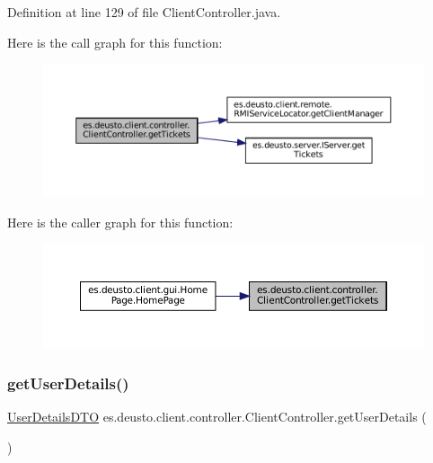 Definition at line 129 of file Client\+Controller.\+java.

Here is the call graph for this function\+:
\nopagebreak
\begin{figure}[H]
\begin{center}
\leavevmode
\includegraphics[width=350pt]{classes_1_1deusto_1_1client_1_1controller_1_1_client_controller_a672fc1afb95f03c33cd659345fe1ca71_cgraph}
\end{center}
\end{figure}
Here is the caller graph for this function\+:
\nopagebreak
\begin{figure}[H]
\begin{center}
\leavevmode
\includegraphics[width=350pt]{classes_1_1deusto_1_1client_1_1controller_1_1_client_controller_a672fc1afb95f03c33cd659345fe1ca71_icgraph}
\end{center}
\end{figure}
\mbox{\label{classes_1_1deusto_1_1client_1_1controller_1_1_client_controller_ac1bd9affe27668ee49320daae38d67a0}} 
\subsubsection{\texorpdfstring{getUserDetails()}{getUserDetails()}}
{\footnotesize\ttfamily \mbox{\hyperlink{classes_1_1deusto_1_1server_1_1data_1_1_user_details_d_t_o}{User\+Details\+D\+TO}} es.\+deusto.\+client.\+controller.\+Client\+Controller.\+get\+User\+Details (\begin{DoxyParamCaption}{ }\end{DoxyParamCaption})}



